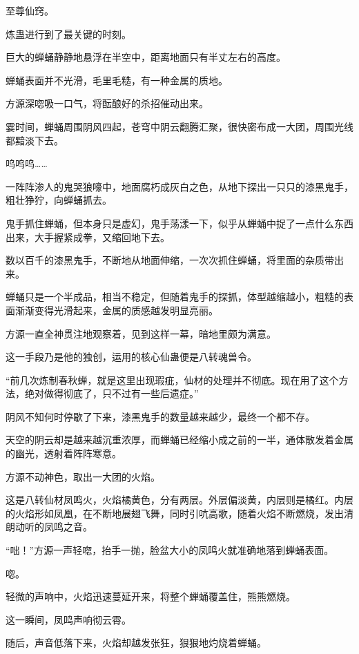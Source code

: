 
\begin{this_body}

至尊仙窍。

炼蛊进行到了最关键的时刻。

巨大的蝉蛹静静地悬浮在半空中，距离地面只有半丈左右的高度。

蝉蛹表面并不光滑，毛里毛糙，有一种金属的质地。

方源深唿吸一口气，将酝酿好的杀招催动出来。

霎时间，蝉蛹周围阴风四起，苍穹中阴云翻腾汇聚，很快密布成一大团，周围光线都黯淡下去。

呜呜呜……

一阵阵渗人的鬼哭狼嚎中，地面腐朽成灰白之色，从地下探出一只只的漆黑鬼手，粗壮狰狞，向蝉蛹抓去。

鬼手抓住蝉蛹，但本身只是虚幻，鬼手荡漾一下，似乎从蝉蛹中捉了一点什么东西出来，大手握紧成拳，又缩回地下去。

数以百千的漆黑鬼手，不断地从地面伸缩，一次次抓住蝉蛹，将里面的杂质带出来。

蝉蛹只是一个半成品，相当不稳定，但随着鬼手的探抓，体型越缩越小，粗糙的表面渐渐变得光滑起来，金属的质感越发明显亮丽。

方源一直全神贯注地观察着，见到这样一幕，暗地里颇为满意。

这一手段乃是他的独创，运用的核心仙蛊便是八转魂兽令。

“前几次炼制春秋蝉，就是这里出现瑕疵，仙材的处理并不彻底。现在用了这个方法，绝对做得彻底了，只不过有一些后遗症。”

阴风不知何时停歇了下来，漆黑鬼手的数量越来越少，最终一个都不存。

天空的阴云却是越来越沉重浓厚，而蝉蛹已经缩小成之前的一半，通体散发着金属的幽光，透射着阵阵寒意。

方源不动神色，取出一大团的火焰。

这是八转仙材凤鸣火，火焰橘黄色，分有两层。外层偏淡黄，内层则是橘红。内层的火焰形如凤凰，在不断地展翅飞舞，同时引吭高歌，随着火焰不断燃烧，发出清朗动听的凤鸣之音。

“咄！”方源一声轻唿，抬手一抛，脸盆大小的凤鸣火就准确地落到蝉蛹表面。

唿。

轻微的声响中，火焰迅速蔓延开来，将整个蝉蛹覆盖住，熊熊燃烧。

这一瞬间，凤鸣声响彻云霄。

随后，声音低落下来，火焰却越发张狂，狠狠地灼烧着蝉蛹。


\end{this_body}
